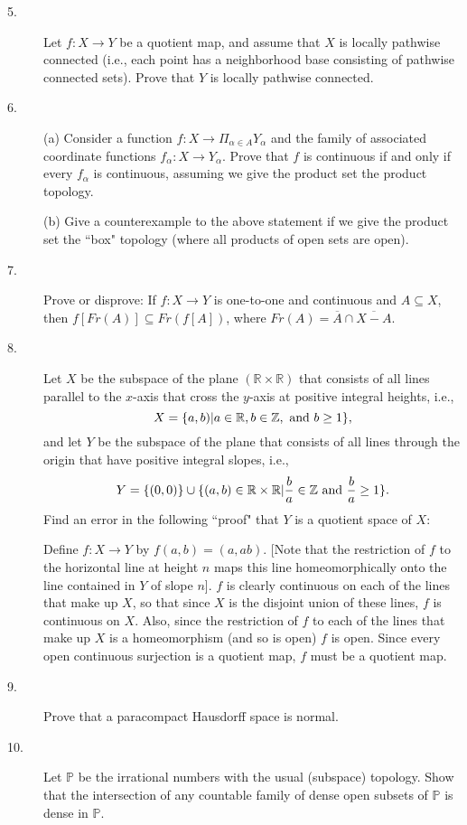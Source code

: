 \documentclass{article}
\def\R{\mathbb R}
\def\Z{\mathbb Z}
\def\P{\mathbb P}
\begin{document}
\begin{description}
\item[5.]
Let $f : X\to Y$ be a quotient map, and assume that $X$ is locally pathwise
connected (i.e., each point has a neighborhood base consisting of pathwise
connected sets). Prove that $Y$ is locally pathwise connected.

\item[6.] (a)
Consider a function $f: X \to \Pi_{\alpha \in A} Y_\alpha$ and the family
of associated coordinate functions $f_\alpha : X \to Y_\alpha$.
Prove that $f$ is continuous if and only if every $f_\alpha$ is continuous,
assuming we give the product set the product topology.

\item[\quad] (b)
Give a counterexample to the above statement if we give the product set the
``box" topology (where all products of open sets are open).

\item[7.]
Prove or disprove: If $f : X\to Y$ is one-to-one and continuous and
$A \subseteq X$, then
$f[Fr (A)] \subseteq Fr (f[A])$, where
$Fr(A) = \overline A \cap \overline{X-A}$.

\item[8.]
Let $X$ be the subspace of the plane $(\R \times \R)$ that consists of all
lines parallel to the $x$-axis that cross the $y$-axis at positive integral
heights, i.e.,
$$X=\{a,b) | a \in \R, b \in \Z, \hbox{\ and\ } b \geq 1\},$$
and let $Y$ be the subspace of the plane that consists of all lines
through the origin that have positive integral slopes, i.e.,
$$Y = \{(0,0)\} \cup \{(a,b) \in \R \times \R | \frac{b}{a} \in \Z
  \hbox{\ and\ } \frac{b}{a} \geq 1\}.$$
Find an error in the following ``proof" that $Y$ is a quotient space of $X$:

Define $f:X \to Y$ by $f(a,b) = (a, ab)$. [Note that the restriction of $f$
to the horizontal line at height $n$ maps this line homeomorphically onto
the line contained in $Y$ of slope $n$]. $f$ is clearly continuous on each
of the lines that make up $X$, so that since $X$ is the disjoint union of
these lines, $f$ is continuous on $X$. Also, since the restriction of $f$ to
each of the lines that make up $X$ is a homeomorphism (and so is open) $f$
is open. Since every open continuous surjection is a quotient map, $f$ must
be a quotient map.

\item[9.]
Prove that a paracompact Hausdorff space is normal.

\item[10.]
Let $\P$ be the irrational numbers with the usual (subspace) topology.
Show that the intersection of any countable family of dense open subsets
of $\P$ is dense in $\P$.


\end{description}
\end{document}
